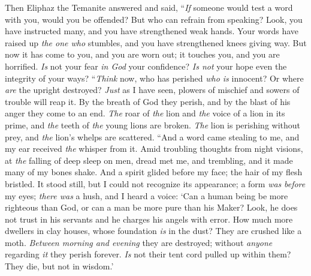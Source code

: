 \begin{biblechapter} %
 Then Eliphaz the Temanite answered and said,
\verse “\textit{If} someone would test a word with you, would you be offended? 
But who can refrain from speaking?
\verse Look, you have instructed many, 
and you have strengthened weak hands.
\verse Your words have raised up \textit{the one who} stumbles, 
and you have strengthened knees giving way.
\verse But now it has come to you, and you are worn out; 
it touches you, and you are horrified.
\verse \textit{Is} not your fear \textit{in God} your confidence? 
\textit{Is not} your hope even the integrity of your ways?
\verse “\textit{Think} now, who has perished \textit{who is} innocent? 
Or where \textit{are} the upright destroyed?
\verse \textit{Just} as I have seen, plowers of mischief 
and sowers of trouble will reap it.
\verse By the breath of God they perish, 
and by the blast of his anger they come to an end.
\verse \textit{The} roar of \textit{the} lion and \textit{the} voice of a lion in its prime, 
and \textit{the} teeth of \textit{the} young lions are broken.
\verse \textit{The} lion is perishing without prey, 
and \textit{the} lion’s whelps are scattered.
\verse “And a word came stealing to me, 
and my ear received \textit{the} whisper from it.
\verse Amid troubling thoughts from night visions, 
at \textit{the} falling of deep sleep on men,
\verse dread met me, and trembling, 
and it made many of my bones shake.
\verse And a spirit glided before my face; 
the hair of my flesh bristled.
\verse It stood still, but I could not recognize its appearance; 
a form \textit{was} \textit{before} my eyes; 
\textit{there was} a hush, and I heard a voice:
\verse ‘Can a human being be more righteous than God, 
or can a man be more pure than his Maker?
\verse Look, he does not trust in his servants 
and he charges his angels with error.
\verse How much more dwellers in clay houses, 
whose foundation \textit{is} in the dust? 
They are crushed like a moth.
\verse \textit{Between morning and evening} they are destroyed; 
without \textit{anyone} regarding \textit{it} they perish forever.
\verse \textit{Is} not their tent cord pulled up within them? 
They die, but not in wisdom.’
\end{biblechapter}

